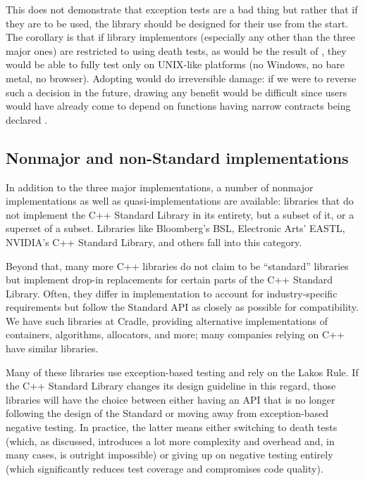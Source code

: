 This does not demonstrate that exception tests are a bad thing but rather that if they are to be used, the library should be designed for their use from the start. The corollary is that if library implementors (especially any other than the three major ones) are restricted to using death tests, as would be the result of \cite{P1656R2}, they would be able to fully test only on UNIX-like platforms (no Windows, no bare metal, no browser). Adopting \cite{P1656R2} would do irreversible damage: if we were to reverse such a decision in the future, drawing any benefit would be difficult since users would have already come to depend on functions having narrow contracts being declared .

\subsection{Nonmajor and non-Standard implementations}

In addition to the three major implementations, a number of nonmajor implementations as well as quasi-implementations are available: libraries that do not implement the C++ Standard Library in its entirety, but a subset of it, or a superset of a subset. Libraries like Bloomberg's BSL, Electronic Arts' EASTL, NVIDIA's C++ Standard Library, and others fall into this category.

Beyond that, many more C++ libraries do not claim to be ``standard'' libraries but implement drop-in replacements for certain parts of the C++ Standard Library. Often, they differ in implementation to account for industry-specific requirements but follow the Standard API as closely as possible for compatibility. We have such libraries at Cradle, providing alternative implementations of containers, algorithms, allocators, and more; many companies relying on C++ have similar libraries.

Many of these libraries use exception-based testing and rely on the Lakos Rule. If the C++ Standard Library changes its design guideline in this regard, those libraries will have the choice between either having an API that is no longer following the design of the Standard or moving away from exception-based negative testing. In practice, the latter means either switching to death tests (which, as discussed, introduces a lot more complexity and overhead and, in many cases, is outright impossible) or giving up on negative testing entirely (which significantly reduces test coverage and compromises code quality).

